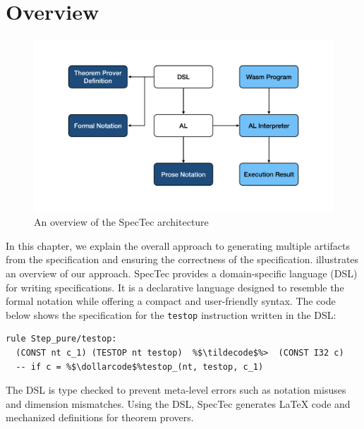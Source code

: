 
\chapter{Overview}
\label{ch:overview}
\noindent


\begin{figure}[t]
  \centerline{\includegraphics[width=15cm]{fig/overview}}
  \caption[An overview of the SpecTec architecture]
    {An overview of the SpecTec architecture}
    \label{fig:overview}
\end{figure}

In this chapter, we explain the overall approach to generating multiple
artifacts from the specification and ensuring the correctness of the
specification.  illustrates an overview of our approach.
SpecTec provides a domain-specific language (DSL) for writing specifications.
It is a declarative language designed to resemble the formal notation while
offering a compact and user-friendly syntax.
The code below shows the specification for the \texttt{testop} instruction
written in the DSL:
\begin{lstlisting}[escapechar=\%]
  rule Step_pure/testop:
  (CONST nt c_1) (TESTOP nt testop)  %$\tildecode$%>  (CONST I32 c)
  -- if c = %$\dollarcode$%testop_(nt, testop, c_1)
\end{lstlisting}
The DSL is type checked to prevent meta-level errors such as notation misuses and
dimension mismatches.
Using the DSL, SpecTec generates LaTeX code and mechanized definitions for theorem provers.


